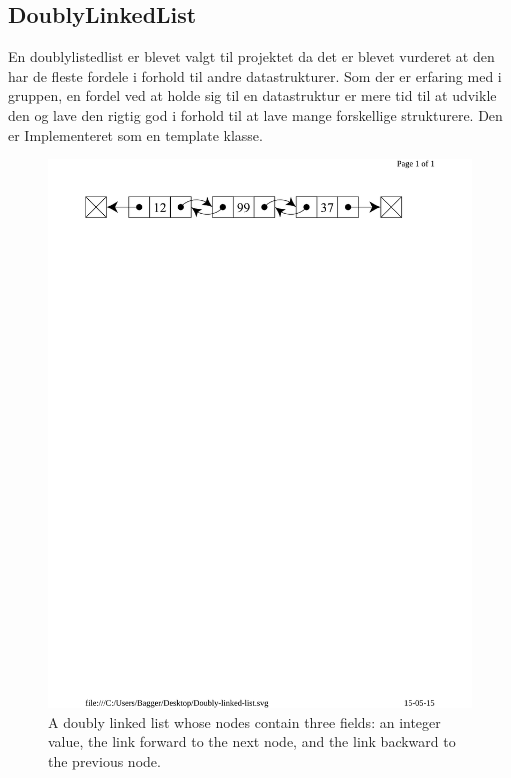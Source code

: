 \subsection{DoublyLinkedList}
\label{sec:DoublyLinkedList}
En doublylistedlist er blevet valgt til projektet da det er blevet vurderet at den har de fleste fordele i forhold til andre datastrukturer. Som der er erfaring med i gruppen, en fordel ved at holde sig til en datastruktur er mere tid til at udvikle den og lave den rigtig god i forhold til at lave mange forskellige strukturere. Den er Implementeret som en template klasse.

\begin{figure}[h]
\centering 
\includegraphics[width={\textwidth-2cm}, trim=0 700 0 50, clip=true] {../fig/Doubly_linked_list.pdf}
\caption{A doubly linked list whose nodes contain three fields: an integer value, the link forward to the next node, and the link backward to the previous node.}
\label{fig:doubly_linked_list}
\end{figure}

